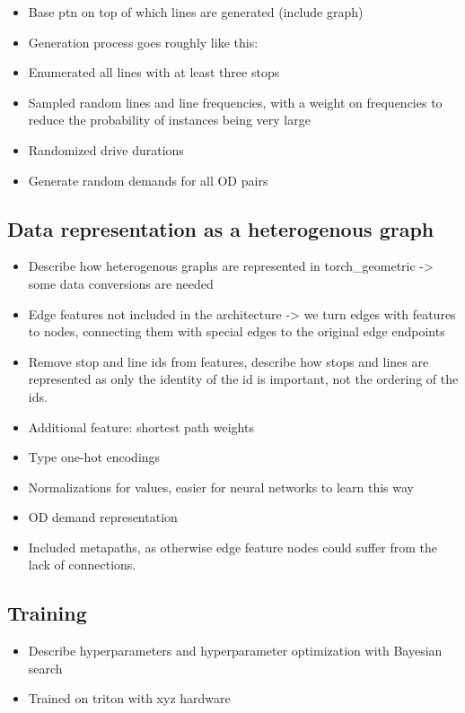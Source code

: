 \documentclass[english, 12pt, a4paper, sci, utf8, a-2b, online]{aaltothesis}
\begin{document}
\begin{itemize}
    \item Base ptn on top of which lines are generated (include graph)
    \item Generation process goes roughly like this:
    \item Enumerated all lines with at least three stops
    \item Sampled random lines and line frequencies, with a weight on frequencies to reduce the probability of instances being very large
    \item Randomized drive durations
    \item Generate random demands for all OD pairs
\end{itemize}

\subsection{Data representation as a heterogenous graph}
\begin{itemize}
    \item Describe how heterogenous graphs are represented in torch\_geometric -> some data conversions are needed
    \item Edge features not included in the architecture -> we turn edges with features to nodes, connecting them with special edges to the original edge endpoints
    \item Remove stop and line ids from features, describe how stops and lines are represented as only the identity of the id is important, not the ordering of the ids.
    \item Additional feature: shortest path weights
    \item Type one-hot encodings
    \item Normalizations for values, easier for neural networks to learn this way
    \item OD demand representation
    \item Included metapaths, as otherwise edge feature nodes could suffer from the lack of connections.
\end{itemize}


\subsection{Training}
\begin{itemize}
    \item Describe hyperparameters and hyperparameter optimization with Bayesian search
    \item Trained on triton with xyz hardware
\end{itemize}
\clearpage
\end{document}
